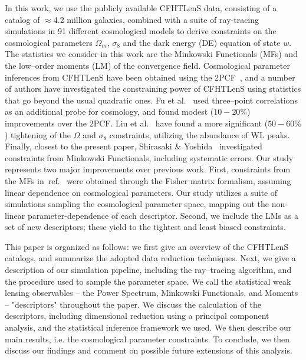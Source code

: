 \documentclass[reprint,aps,prd,superscriptaddress,showkeys,showpacs]{revtex4-1}
\begin{document}
In this work, we use the publicly available CFHTLenS data, consisting
of a catalog of $\approx$4.2 million galaxies, combined with a suite
of ray-tracing simulations in 91 different cosmological models to
derive constraints on the cosmological parameters $\Omega_m$,
$\sigma_8$ and the dark energy (DE) equation of state $w$.  The
statistics we consider in this work are the Minkowski Functionals
(MFs) and the low--order moments (LM) of the convergence field.
Cosmological parameter inferences from CFHTLenS have been obtained
using the 2PCF~\citep{CFHTKilbinger}, and a number of authors have
investigated the constraining power of CFHTLenS using statistics that
go beyond the usual quadratic ones. Fu et al.~\citep{CFHTFu} used
three--point correlations as an additional probe for cosmology, and
found modest ($10-20\%$) improvements over the 2PCF.  Liu et
al.~\citep{Companion} have found a more significant ($50-60\%$)
tightening of the $\Omega$ and $\sigma_8$ constraints, utilizing the
abundance of WL peaks.
Finally, closest to the present paper, Shirasaki \&
Yoshida~\citep{CFHTMasato} investigated constraints from Minkowski
Functionals, including systematic errors.  Our study represents two
major improvements over previous work.  First, constraints from the
MFs in~ref.~\citep{CFHTMasato} were obtained through the Fisher matrix
formalism, assuming linear dependence on cosmological parameters. Our
study utilizes a suite of simulations sampling the cosmological
parameter space, mapping out the non-linear parameter-dependence of
each descriptor.  Second, we include the LMs as a set of new
descriptors; these yield to the tightest and least biased constraints.


This paper is organized as follows: we first give an overview of the
CFHTLenS catalogs, and summarize the adopted data reduction
techniques. Next, we give a description of our simulation pipeline,
including the ray--tracing algorithm, and the procedure used to sample
the parameter space. We call the statistical weak lensing observables
-- the Power Spectrum, Minkowski Functionals, and Moments --
"descriptors" throughout the paper. We discuss the calculation of the
descriptors, including dimensional reduction using a principal
component analysis, and the statistical inference framework we
used. We then describe our main results, i.e. the cosmological
parameter constraints. To conclude, we then discuss our findings and
comment on possible future extensions of this analysis.
\end{document}
